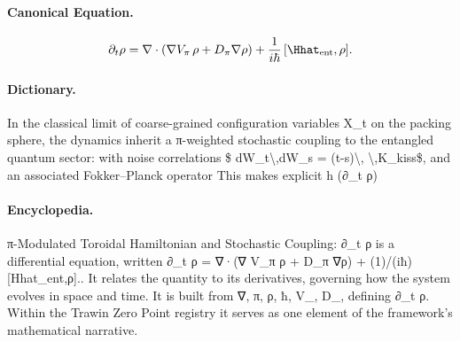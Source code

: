 \paragraph{Canonical Equation.}
\[
\partial_t \rho = \nabla\cdot(\nabla V_{\pi}\,\rho + D_{\pi} \nabla\rho) + \frac{1}{i\hbar}\,[\Hhat_{\mathrm{ent}},\rho].
\]

\paragraph{Dictionary.}
In the classical limit of coarse-grained configuration variables X\_t on the packing sphere, the dynamics inherit a π-weighted stochastic coupling to the entangled quantum sector: with noise correlations \$ dW\_t\textbackslash{},dW\_s = (t-s)\textbackslash{}, \textbackslash{},K\_kiss\$, and an associated Fokker--Planck operator This makes explicit h (∂\_t ρ)

\paragraph{Encyclopedia.}
π-Modulated Toroidal Hamiltonian and Stochastic Coupling: ∂\_t ρ is a differential equation, written ∂\_t ρ = ∇·(∇ V\_π ρ + D\_π ∇ρ) + (1)/(iħ) [Hhat\_ent,ρ].. It relates the quantity to its derivatives, governing how the system evolves in space and time. It is built from ∇, π, ρ, ħ, V\_, D\_, defining ∂\_t ρ. Within the Trawin Zero Point registry it serves as one element of the framework's mathematical narrative.

